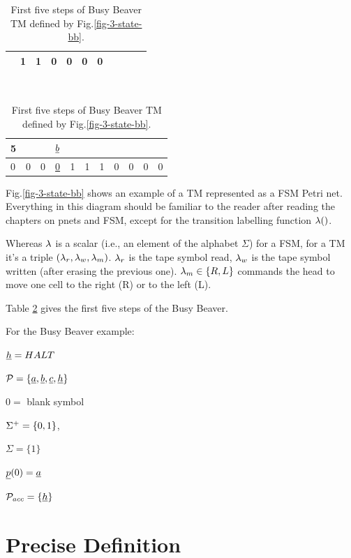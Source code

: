 \begin{table}[h!]
\begin{tabular}{lllllllllll}
& \multicolumn{1}{l|}{1} 
& \multicolumn{1}{l|}{\cellcolor[HTML]{FFFFC7}1} 
& \multicolumn{1}{l|}{0} 
& \multicolumn{1}{l|}{\cellcolor[HTML]{FFFFC7}0} 
& \multicolumn{1}{l|}{0} 
& \multicolumn{1}{l|}{\cellcolor[HTML]{FFFFC7}0} 
\\ \hline
\end{tabular}
\\
\begin{tabular}{lllllllllll}
5 &  &  & $\rvb$ & & &  &  &  &  &  
\\ \hline
\multicolumn{1}{|l|}{\cellcolor[HTML]{FFFFC7}0} 
& \multicolumn{1}{l|}{0} 
& \multicolumn{1}{l|}{\cellcolor[HTML]{FFFFC7}0} 
& \multicolumn{1}{l|}{\ul{0}} 
& \multicolumn{1}{l|}{\cellcolor[HTML]{FFFFC7}1} 
& \multicolumn{1}{l|}{1} 
& \multicolumn{1}{l|}{\cellcolor[HTML]{FFFFC7}1} 
& \multicolumn{1}{l|}{0} 
& \multicolumn{1}{l|}{\cellcolor[HTML]{FFFFC7}0} 
& \multicolumn{1}{l|}{0} 
& \multicolumn{1}{l|}{\cellcolor[HTML]{FFFFC7}0} 
\\ \hline
\end{tabular}
\caption{First five steps of Busy Beaver TM 
defined by Fig.\ref{fig-3-state-bb}. }
\label{tab-busy-beaver}
\end{table}

Fig.\ref{fig-3-state-bb} shows an example of
a TM represented as a FSM Petri net. Everything in this diagram
should be familiar to the reader after reading the chapters
on pnets and FSM, except for the
transition  labelling function $\lambda()$.

Whereas $\lambda$ is a scalar (i.e., an element of the alphabet $\Sigma$)
for a FSM, for a TM it's a triple $(\lambda_r, \lambda_w, \lambda_m)$.
$\lambda_r$ is the tape symbol read, $\lambda_w$
is the tape symbol written (after erasing the 
previous one). $\lambda_m\in\{R, L\}$
commands the head to move one cell to the right (R)
or to the left (L).

Table \ref{tab-busy-beaver} gives the first five 
steps of the  Busy Beaver.

For the Busy Beaver example:

$\rvh=HALT$

$\calp= \{\rva, \rvb, \rvc, \rvh\}$  

$0=$ blank symbol

$\Sigma^+ =\{0,1\}$, 

$\Sigma = \{1\}$

$\rvp(0)=\rva$

$\calp_{acc} =\{\rvh \}$




\section{Precise Definition}

